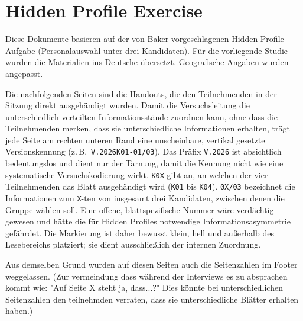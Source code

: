 \newcommand{\hiddenversion}[1]{%
  \par\noindent
  \makebox[0pt][l]{%
    \hspace*{\dimexpr\paperwidth-1in-\hoffset
      -\ifodd\value{page}\oddsidemargin\else\evensidemargin\fi
    -8mm\relax}%
    \raisebox{-\dimexpr\pagegoal-\pagetotal+22mm\relax}[0pt][0pt]{%
      \rotatebox{90}{%
        \fontsize{6}{7}\selectfont\textcolor{black!45}{#1}%
      }%
    }%
  }%
  \par
}

\section{Hidden Profile Exercise}
\label{annex:hidden-profile-exercise}

Diese Dokumente basieren auf der von Baker \cite{bakerEnhancingGroupDecision2010} vorgeschlagenen
Hidden-Profile-Aufgabe (Personalauswahl unter drei Kandidaten). Für die vorliegende Studie wurden die
Materialien ins Deutsche übersetzt. Geografische Angaben wurden angepasst.

Die nachfolgenden Seiten sind die Handouts, die den Teilnehmenden in der Sitzung direkt ausgehändigt
wurden. Damit die Versuchsleitung die unterschiedlich verteilten Informationsstände zuordnen kann,
ohne dass die Teilnehmenden merken, dass sie unterschiedliche Informationen erhalten, trägt jede Seite
am rechten unteren Rand eine unscheinbare, vertikal gesetzte Versionskennung
(z.\,B.\ \texttt{V.2026K01-01/03}).
Das Präfix \texttt{V.2026} ist absichtlich bedeutungslos und dient nur der Tarnung, damit die Kennung
nicht wie eine systematische Versuchskodierung wirkt.
\texttt{K0X} gibt an, an welchen der vier Teilnehmenden das Blatt ausgehändigt wird (\texttt{K01} bis
\texttt{K04}).
\texttt{0X/03} bezeichnet die Informationen zum \texttt{X}-ten von insgesamt drei Kandidaten, zwischen
denen die Gruppe wählen soll.
Eine offene, blattspezifische Nummer wäre verdächtig gewesen und hätte die für Hidden Profiles
notwendige Informationsasymmetrie gefährdet. Die Markierung ist daher bewusst klein, hell und
außerhalb des Lesebereichs platziert; sie dient ausschließlich der internen Zuordnung.

Aus demselben Grund wurden auf diesen Seiten auch die Seitenzahlen im Footer weggelassen. (Zur vermeindung
  dass während der Interviews es zu absprachen kommt wie: "Auf Seite X steht ja, dass...?" Dies könnte bei
unterschiedlichen Seitenzahlen den teilnehmden verraten, dass sie unterschiedliche Blätter erhalten haben.)

